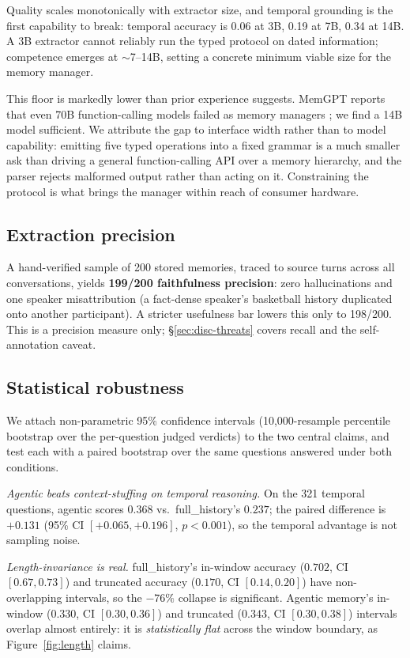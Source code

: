 Quality scales monotonically with extractor size, and temporal grounding is the
first capability to break: temporal accuracy is 0.06 at 3B, 0.19 at 7B, 0.34 at
14B. A 3B extractor cannot reliably run the typed
protocol on dated information; competence emerges at $\sim$7--14B, setting a
concrete minimum viable size for the memory manager.

This floor is markedly lower than prior experience suggests. MemGPT reports that
even 70B function-calling models failed as memory managers
\citep{packer2023memgpt}; we find a 14B model sufficient. We attribute the gap to
interface width rather than to model capability: emitting five typed operations
into a fixed grammar is a much smaller ask than driving a general function-calling
API over a memory hierarchy, and the parser rejects malformed output rather than
acting on it. Constraining the protocol is what brings the manager within reach
of consumer hardware.

\subsection{Extraction precision}
\label{sec:results-precision}
A hand-verified sample of 200 stored memories, traced to source turns across all
conversations, yields \textbf{199/200 faithfulness precision}: zero
hallucinations and one speaker misattribution (a fact-dense speaker's basketball
history duplicated onto another participant). A stricter usefulness bar lowers
this only to 198/200. This is a precision measure only;
\S\ref{sec:disc-threats} covers recall and the self-annotation caveat.

\subsection{Statistical robustness}
\label{sec:results-robustness}
We attach non-parametric 95\% confidence intervals (10{,}000-resample
percentile bootstrap over the per-question judged verdicts) to the two central
claims, and test each with a paired bootstrap over the same questions answered
under both conditions.

\emph{Agentic beats context-stuffing on temporal reasoning.} On the 321
temporal questions, agentic scores $0.368$ vs.\ full\_history's $0.237$; the
paired difference is $+0.131$ (95\% CI $[+0.065, +0.196]$, $p<0.001$),
so the temporal advantage is not sampling noise.

\emph{Length-invariance is real.} full\_history's in-window accuracy
($0.702$, CI $[0.67, 0.73]$) and truncated accuracy ($0.170$, CI
$[0.14, 0.20]$) have non-overlapping intervals, so the $-76\%$ collapse is
significant. Agentic memory's in-window ($0.330$, CI $[0.30, 0.36]$) and
truncated ($0.343$, CI $[0.30, 0.38]$) intervals overlap almost entirely: it
is \emph{statistically flat} across the window boundary, as
Figure~\ref{fig:length} claims.


